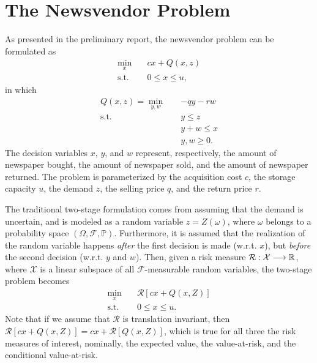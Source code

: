 \documentclass[12pt]{article}
\begin{document}
\section*{The Newsvendor Problem}

As presented in the preliminary report, the newsvendor problem can be formulated as 
\begin{equation}\label{eq:deterministic-2sp-ul}
\begin{split}
    \min_{x} \quad & c x + Q(x,z) \\
    \textrm{s.t.} \quad & 0\le x\le u
,\end{split}
\end{equation}
in which 
\begin{equation}\label{eq:deterministic-2sp-ll}
\begin{split}
    Q(x,z) = \min_{y,w} \quad & -q y - r w \\
    \textrm{s.t.} \quad & y\le z \\
      & y+w \le x \\
      & y,w \ge 0
.\end{split}
\end{equation}
The decision variables $x$, $y$, and $w$ represent, respectively, the amount of newspaper bought, the amount of newspaper sold, and the amount of newspaper returned.
The problem is parameterized by the acquisition cost $c$, the storage capacity $u$, the demand $z$, the selling price $q$, and the return price $r$.

The traditional two-stage formulation comes from assuming that the demand is uncertain, and is modeled as a random variable $z=Z(\omega)$, where  $\omega$ belongs to a probability space $(\Omega, \mathcal{F},\mathbb{P})$.
Furthermore, it is assumed that the realization of the random variable happens \emph{after} the first decision is made (w.r.t. $x$), but \emph{before} the second decision (w.r.t. $y$ and $w$).
Then, given a risk measure $\mathcal{R}: \mathcal{X} \longrightarrow \mathbb{R}$, where $\mathcal{X}$ is a linear subspace of all $\mathcal{F}$-measurable random variables, the two-stage problem becomes
\begin{equation}\label{eq:two-stage}
\begin{split}
    \min_{x} \quad & \mathcal{R}[c x + Q(x,Z)] \\
    \textrm{s.t.} \quad & 0\le x\le u
.\end{split}
\end{equation}
Note that if we assume that $\mathcal{R}$ is translation invariant, then $\mathcal{R}[c x + Q(x,Z)] = cx + \mathcal{R}[Q(x,Z)]$, which is true for all three the risk measures of interest, nominally, the expected value, the value-at-risk, and the conditional value-at-risk.
\end{document}
